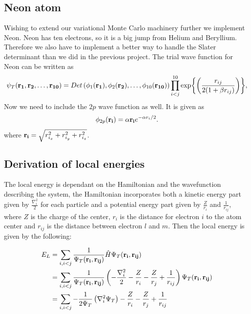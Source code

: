 \documentclass[11pt]{article}
\begin{document}
	\subsection{Neon atom}
		Wishing to extend our variational Monte Carlo machinery further we implement Neon. Neon has ten electrons, so it is a big jump from Helium and Beryllium. Therefore we also have to implement a better way to handle the Slater determinant than we did in the previous project. The trial wave function for Neon can be written as
		\begin{equation}
		   \psi_{T}({\bf r_1},{\bf r_2}, \dots,{\bf r_{10}}) =
		   Det\left(\phi_{1}({\bf r_1}),\phi_{2}({\bf r_2}),
		   \dots,\phi_{10}({\bf r_{10}})\right)
		   \prod_{i<j}^{10}\exp{\left(\frac{r_{ij}}{2(1+\beta r_{ij})}\right)},
		   \label{eq:NeonTrialFunction}
		\end{equation}
		Now we need to include the $2p$ wave function as well. It is given as
		\begin{equation}
			\phi_{2p}({\bf r_i}) = \alpha {\bf r_i}e^{-\alpha r_i/2}.
		\end{equation}
		where $ {\bf r_i} = \sqrt{r_{i_x}^2+r_{i_y}^2+r_{i_z}^2}$.

	\subsection{Derivation of local energies}
		The local energy is dependant on the Hamiltonian and the wavefunction describing the system, the Hamiltonian incorporates both a kinetic energy part given by \( \frac{\nabla_i^2}{2} \) for each particle
		and a potential energy part given by \(\frac{Z}{r_i}\) and \(\frac{1}{r_{ij}}\), where \(Z\) is the charge of the center, \(r_i\) is the distance for electron \(i\) to the atom center and \(r_{ij}\) is the distance between electron \(l\) and \(m\). Then the local energy is given by the following:

		\begin{align}
			E_L &= \sum_{i,i<j}{\frac{1}{ \Psi_T(\vb{r_i} , \vb{r_{ij}}) } \hat{H} \Psi_T(\vb{r_i} , \vb{r_{ij}})}
			\\
			&=	\sum_{i,i<j}\frac{1}{ \Psi_T(\vb{r_i} , \vb{r_{ij}}) } \left( - \frac{\nabla_i^2}{2} -\frac{Z}{r_i}  -  \frac{Z}{r_j} +  \frac{1}{r_{ij} }  \right) \Psi_T(\vb{r_i} , \vb{r_{ij}})
			\\
			&= \sum_{i,i<j}{-\frac{1}{2\Psi_T} \left(\nabla_i^2 \Psi_T  \right)  -\frac{Z}{r_i}  -  \frac{Z}{r_j} +  \frac{1}{r_{ij} }}
		\end{align}
\end{document}

